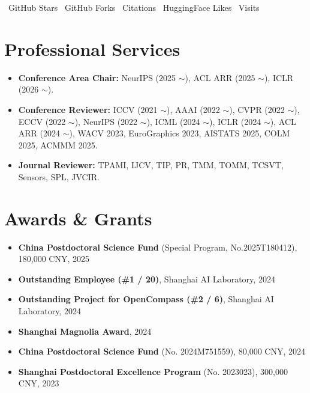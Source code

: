 \documentclass{resume}
\newcommand{\secgap}{\vspace{1mm}}%
\begin{document}
\vspace{-2mm}
\scriptsize \faStar \  GitHub Stars \quad \faCodeFork \ GitHub Forks \quad \faBarChart \  Citations \quad \faHeart \  HuggingFace Likes \quad  \faMousePointer \  Visits \normalsize

\secgap

\section{Professional Services}

\begin{itemize}[parsep=0ex]

\item \textbf{Conference Area Chair:}
NeurIPS (2025 $\sim$), ACL ARR (2025 $\sim$), ICLR (2026 $\sim$).

\item \textbf{Conference Reviewer:} 
ICCV (2021 $\sim$), AAAI (2022 $\sim$), CVPR (2022 $\sim$), ECCV (2022 $\sim$), 
NeurIPS (2022 $\sim$), ICML (2024 $\sim$), ICLR (2024 $\sim$), ACL ARR (2024 $\sim$), WACV 2023, EuroGraphics 2023, AISTATS 2025, COLM 2025, ACMMM 2025. 

\item \textbf{Journal Reviewer:} TPAMI, IJCV, TIP, PR, TMM, TOMM, TCSVT, Sensors, SPL, JVCIR.
\end{itemize}

\secgap

\section{Awards \& Grants}

\begin{itemize}[parsep=0ex]
  \item \textbf{China Postdoctoral Science Fund} (Special Program, No.2025T180412), 180,000 CNY, 2025
  \item \textbf{Outstanding Employee (\#1 / 20)}, Shanghai AI Laboratory, 2024
  \item \textbf{Outstanding Project for OpenCompass (\#2 / 6)}, Shanghai AI Laboratory, 2024
  \item \textbf{Shanghai Magnolia Award}, 2024
  \item \textbf{China Postdoctoral Science Fund} (No. 2024M751559), 80,000 CNY, 2024
  \item \textbf{Shanghai Postdoctoral Excellence Program} (No. 2023023), 300,000 CNY, 2023
\end{itemize}
\end{document}
